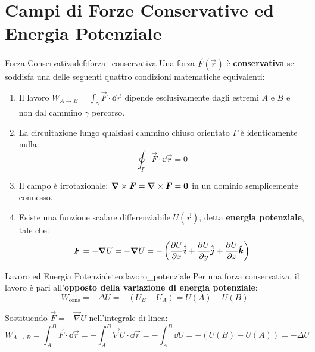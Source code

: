 \section{Campi di Forze Conservative ed Energia Potenziale}
\label{sec:forze_conservative}

\begin{definizione}{Forza Conservativa}{def:forza_conservativa}
Una forza $\vec{F}(\vec{r})$ è \textbf{conservativa} se soddisfa una delle seguenti quattro condizioni matematiche equivalenti:
\begin{enumerate}
    \item Il lavoro $W_{A\to B} = \int_{\gamma} \vec{F}\cdot\dd\vec{r}$ dipende esclusivamente dagli estremi $A$ e $B$ e non dal cammino $\gamma$ percorso.
    \item La circuitazione lungo qualsiasi cammino chiuso orientato $\Gamma$ è identicamente nulla:
    \begin{equation}
        \oint_\Gamma \vec{F}\cdot\dd\vec{r} = 0
    \end{equation}
    \item Il campo è irrotazionale: $\bm{\nabla}\times\bm{F} = \bm{\nabla}\times\bm{F} = \bm{0}$ in un dominio semplicemente connesso.
    \item Esiste una funzione scalare differenziabile $U(\vec{r})$, detta \textbf{energia potenziale}, tale che:
    \begin{equation}
        \bm{F} = -\bm{\nabla} U = -\bm{\nabla}U = -\left(\frac{\partial U}{\partial x}\hat{\bm{i}} + \frac{\partial U}{\partial y}\hat{\bm{j}} + \frac{\partial U}{\partial z}\hat{\bm{k}}\right)
        \label{eq:gradiente_potenziale}
    \end{equation}
\end{enumerate}
\end{definizione}

\begin{teorema}{Lavoro ed Energia Potenziale}{teo:lavoro_potenziale}
Per una forza conservativa, il lavoro è pari all'\textbf{opposto della variazione di energia potenziale}:
\begin{equation}
    W_{\text{cons}} = -\Delta U = -(U_B - U_A) = U(A) - U(B)
    \label{eq:lavoro_u}
\end{equation}
\end{teorema}

\begin{dimostrazione}
Sostituendo $\vec{F} = -\vec{\nabla}U$ nell'integrale di linea:
\begin{equation}
    W_{A\to B} = \int_A^B \vec{F}\cdot\dd\vec{r} = -\int_A^B \vec{\nabla}U\cdot\dd\vec{r} = -\int_A^B \dd U = -(U(B) - U(A)) = -\Delta U
\end{equation}
\end{dimostrazione}

